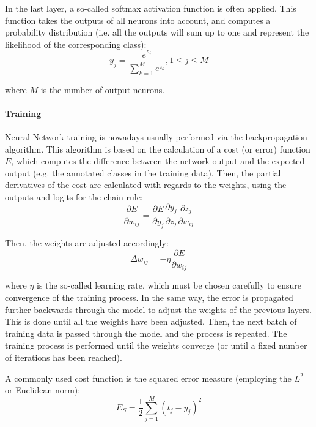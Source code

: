             In the last layer, a so-called softmax activation function is often applied. 
            This function takes the outputs of all neurons into account, and computes a probability distribution (i.e. all the outputs will sum up to one and represent the likelihood of the corresponding class):
            \begin{equation}
                y_j = \frac{e^{z_j}}{\sum_{k=1}^M e^{z_k}}, 1 \leq j \leq M
            \end{equation}

            where $M$ is the number of output neurons.

            \paragraph{Training} Neural Network training is nowadays usually performed via the backpropagation algorithm. 
            This algorithm is based on the calculation of a cost (or error) function $E$, which computes the difference between the network output and the expected output (e.g. the annotated classes in the training data). 
            Then, the partial derivatives of the cost are calculated with regards to the weights, using the outputs and logits for the chain rule:
            \begin{equation}
                \frac{\partial E}{\partial w_{ij}} = \frac{\partial E}{\partial y_j} \frac{\partial y_j}{\partial z_j} \frac{\partial z_j}{\partial w_{ij}}
            \end{equation}

            Then, the weights are adjusted accordingly:
            \begin{equation}
                \Delta w_{ij} = - \eta \frac{\partial E}{\partial w_{ij}}
            \end{equation}

            where $\eta$ is the so-called learning rate, which must be chosen carefully to ensure convergence of the training process. 
            In the same way, the error is propagated further backwards through the model to adjust the weights of the previous layers. 
            This is done until all the weights have been adjusted. 
            Then, the next batch of training data is passed through the model and the process is repeated. 
            The training process is performed until the weights converge (or until a fixed number of iterations has been reached).

            A commonly used cost function is the squared error measure (employing the $L^2$ or Euclidean norm):
            \begin{equation}
                E_S = \frac{1}{2} \sum_{j=1}^{M} (t_j - y_j)^2
            \end{equation}

